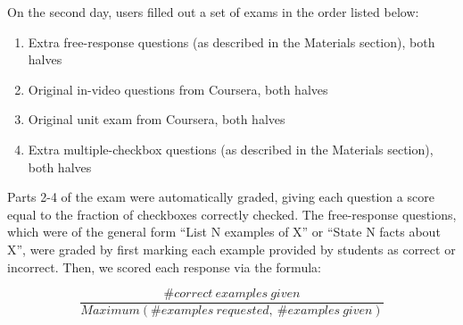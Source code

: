 \documentclass{sigchi}
\begin{document}
On the second day, users filled out a set of exams in the order listed below:

\begin{enumerate}
\item Extra free-response questions (as described in the Materials section), both halves
\item Original in-video questions from Coursera, both halves
\item Original unit exam from Coursera, both halves
\item Extra multiple-checkbox questions (as described in the Materials section), both halves
\end{enumerate}

Parts 2-4 of the exam were automatically graded, giving each question a score equal to the fraction of checkboxes correctly checked. The free-response questions, which were of the general form ``List N examples of X'' or ``State N facts about X'', were graded by first marking each example provided by students as correct or incorrect. %
Then, we scored each response via the formula:


\vspace{-4mm}

\[ \frac{\# correct\ examples\ given}{Maximum(\# examples\ requested,\ \# examples\ given)} \]


\end{document}
